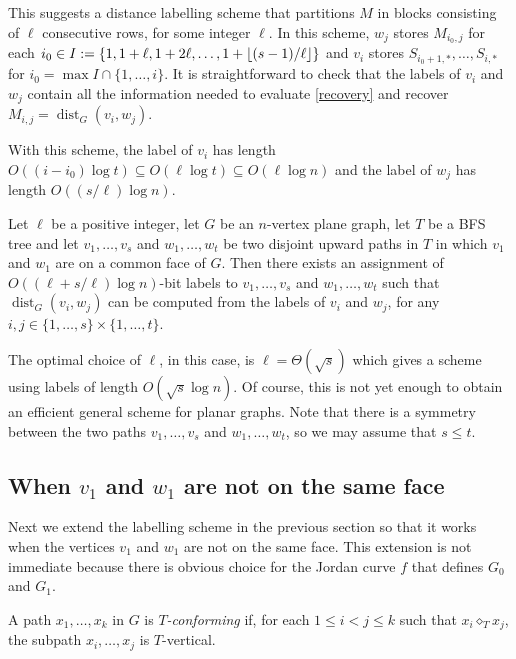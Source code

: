 \documentclass{patmorin}
\DeclareMathOperator{\dist}{dist}
\newcommand{\comparable}{\mathbin{\diamond}}
\begin{document}
This suggests a distance labelling scheme that partitions $M$ in blocks consisting of $\ell$ consecutive rows, for some integer $\ell$.  In this scheme, $w_j$ stores $M_{i_0,j}$ for each $i_0\in I := \{1,1+\ell,1+2\ell,\ldots,1+{\lfloor (s-1)/\ell \rfloor}\}$ and $v_i$ stores $S_{i_0+1,*},\ldots,S_{i,*}$ for $i_0=\max I\cap\{1,\ldots,i\}$.  It is straightforward to check that the labels of $v_i$ and $w_j$ contain all the information needed to evaluate \cref{recovery} and recover $M_{i,j}=\dist_G(v_i,w_j)$.

With this scheme, the label of $v_i$ has length $O((i-i_0)\log t)\subseteq O(\ell\log t)\subseteq O(\ell\log n)$ and the label of $w_j$ has length $O((s/\ell)\log n)$.

\begin{lem}\label{sameface_labelling}
    Let $\ell$ be a positive integer, let $G$ be an $n$-vertex plane graph, let $T$ be a BFS tree and let $v_1,\ldots,v_s$ and $w_1,\ldots,w_t$ be two disjoint upward paths in $T$ in which $v_1$ and $w_1$ are on a common face of $G$.    Then there exists an assignment of $O((\ell + s/\ell)\log n)$-bit labels to $v_1,\ldots,v_s$ and $w_1,\ldots,w_t$ such that $\dist_G(v_i,w_j)$ can be computed from the labels of $v_i$ and $w_j$, for any $i,j\in\{1,\ldots,s\}\times\{1,\ldots,t\}$.
\end{lem}

The optimal choice of $\ell$, in this case, is $\ell=\Theta(\sqrt{s})$ which gives a scheme using labels of length $O(\sqrt{s}\log n)$.  Of course, this is not yet enough to obtain an efficient general scheme for planar graphs.  Note that there is a symmetry between the two paths $v_1,\ldots,v_s$ and $w_1,\ldots,w_t$, so we may assume that $s\le t$.


\subsection{When $v_1$ and $w_1$ are not on the same face}

Next we extend the labelling scheme in the previous section so that it works when the vertices $v_1$ and $w_1$ are not on the same face.  This extension is not immediate because there is obvious choice for the Jordan curve $f$ that defines $G_0$ and $G_1$.

A path $x_1,\ldots,x_k$ in $G$ is \emph{$T$-conforming} if, for each $1\le i< j\le k$ such that $x_i\comparable_T x_j$, the subpath $x_i,\ldots,x_j$ is $T$-vertical.
\end{document}
